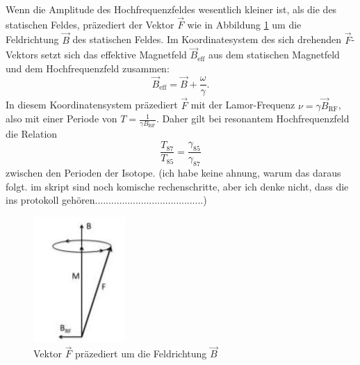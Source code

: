 Wenn die Amplitude des Hochfrequenzfeldes wesentlich kleiner ist, als die des statischen Feldes, präzediert der Vektor $\vec F$ wie in Abbildung \ref{abb:8} um die Feldrichtung $\vec{B}$ des statischen Feldes.
Im Koordinatesystem des sich drehenden $\vec{F}$-Vektors setzt sich das effektive Magnetfeld $\vec{B}_\text{eff}$ aus dem statischen Magnetfeld und dem Hochfrequenzfeld zusammen:
\begin{equation}
  \vec{B}_\text{eff}=\vec{B}+\frac{\omega}{\gamma}.
\end{equation}
In diesem Koordinatensystem präzediert $\vec{F}$ mit der Lamor-Frequenz $\nu=\gamma \vec{B}_\text{RF}$, also mit einer Periode von $T=\frac{1}{\gamma B_\text{RF} }$. Daher gilt bei resonantem Hochfrequenzfeld die Relation
\begin{equation}
  \frac{T_\text{87}}{T_\text{85}}=\frac{\gamma_\text{85}}{\gamma_\text{87}}
\end{equation}
zwischen den Perioden der Isotope. (ich habe keine ahnung, warum das daraus folgt. im skript sind noch komische rechenschritte, aber ich denke nicht, dass die ins protokoll gehören........................................)
\begin{figure}[H]
	\centering
	\includegraphics[width=3.5cm]{abb8.jpg}
	\caption{Vektor $\vec F$ präzediert um die Feldrichtung $\vec{B}$ \cite{V21}}
	\label{abb:8}
\end{figure}
